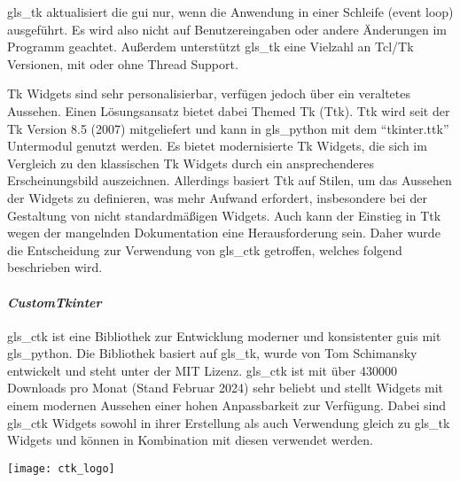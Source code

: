 \gls{gls_tk} aktualisiert die \acs{gui} nur, wenn die Anwendung in einer Schleife (event loop) ausgeführt. Es wird also nicht auf Benutzereingaben oder andere Änderungen im Programm geachtet. Außerdem unterstützt \gls{gls_tk} eine Vielzahl an Tcl/Tk Versionen, mit oder ohne Thread Support. \cite[vgl.][]{Python_Software_Foundation_Tk:o.J.}

Tk Widgets sind sehr personalisierbar, verfügen jedoch über ein veraltetes Aussehen. Einen Lösungsansatz bietet dabei Themed Tk (Ttk). Ttk wird seit der Tk Version 8.5 (2007) mitgeliefert und kann in \gls{gls_python} mit dem \enquote{tkinter.ttk} Untermodul genutzt werden. Es bietet modernisierte Tk Widgets, die sich im Vergleich zu den klassischen Tk Widgets durch ein ansprechenderes Erscheinungsbild auszeichnen. Allerdings basiert Ttk  auf Stilen, um das Aussehen der Widgets zu definieren, was mehr Aufwand erfordert, insbesondere bei der Gestaltung von nicht standardmäßigen Widgets. Auch kann der Einstieg in Ttk wegen der mangelnden Dokumentation eine Herausforderung sein. Daher wurde die Entscheidung zur Verwendung von \gls{gls_ctk} getroffen, welches folgend beschrieben wird. \cite[vgl.][]{Python_Software_Foundation_Tk:o.J., stackoverflow_tk_ttk:2013}


\paragraph{\textit{CustomTkinter}}\label{ctk_kapitel}
\begin{minipage}{0.6\textwidth}
	\gls{gls_ctk} ist eine Bibliothek zur Entwicklung moderner und konsistenter \acsp{gui} mit \gls{gls_python}. Die Bibliothek basiert auf \gls{gls_tk}, wurde von Tom Schimansky entwickelt und steht unter der MIT Lizenz. \gls{gls_ctk} ist mit über 430000 Downloads pro Monat (Stand Februar 2024) sehr beliebt und stellt Widgets mit einem modernen Aussehen einer hohen Anpassbarkeit zur Verfügung. Dabei sind \gls{gls_ctk} Widgets sowohl in ihrer Erstellung als auch Verwendung gleich zu \gls{gls_tk} Widgets und können in Kombination mit diesen verwendet werden. \cite[vgl.][]{Schimansky_Git:o.J.}
\end{minipage}%
\hfill
\begin{minipage}{0.37\textwidth}
	\centering	
	\texttt{[image: ctk\_logo]}
\end{minipage}
\vspace{1ex}

